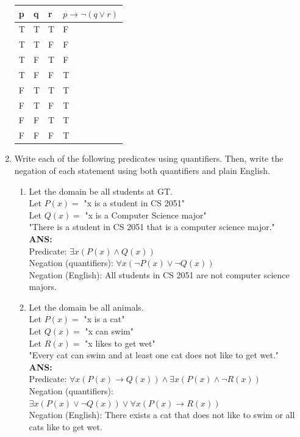 \documentclass{article}
\begin{document}
\begin{enumerate}
    \begin{tabular}{|l|l|l|l|}
\hline
p & q & r & $p \rightarrow \neg (q \lor r)$ \\ \hline
T & T & T & F                          \\ \hline
T & T & F & F                          \\ \hline
T & F & T & F                          \\ \hline
T & F & F & T                          \\ \hline
F & T & T & T                          \\ \hline
F & T & F & T                          \\ \hline
F & F & T & T                          \\ \hline
F & F & F & T                          \\ \hline
\end{tabular}

    \item Write each of the following predicates using quantifiers. Then, write the negation of each statement using both quantifiers and plain English.
    \begin{enumerate}
        \item Let the domain be all students at GT. \\ 
            Let $P(x) = $ "x is a student in CS 2051" \\ 
            Let $Q(x) = $ "x is a Computer Science major" \\
            "There is a student in CS 2051 that is a computer science major." \\
        \textbf{ANS:} \\
        Predicate: $\exists x(P(x) \land Q(x))$ \\
        Negation (quantifiers): $\forall x(\neg P(x) \lor \neg Q(x))$ \\
        Negation (English): All students in CS 2051 are not computer science majors. \\
        
        \item Let the domain be all animals. \\ 
            Let $P(x) = $ "x is a cat" \\ 
            Let $Q(x) = $ "x can swim" \\
            Let $R(x) = $ "x likes to get wet" \\
            "Every cat can swim and at least one cat does not like to get wet." \\
        \textbf{ANS:} \\
            Predicate: $\forall x(P(x) \rightarrow Q(x)) \land \exists x(P(x) \land \neg R(x))$ \\
            Negation (quantifiers): $\exists x(P(x) \lor \neg Q(x)) \lor \forall x(P(x) \rightarrow R(x))$ \\
            Negation (English): There exists a cat that does not like to swim or all cats like to get wet. \\


\end{enumerate}
\end{enumerate}
\end{document}
